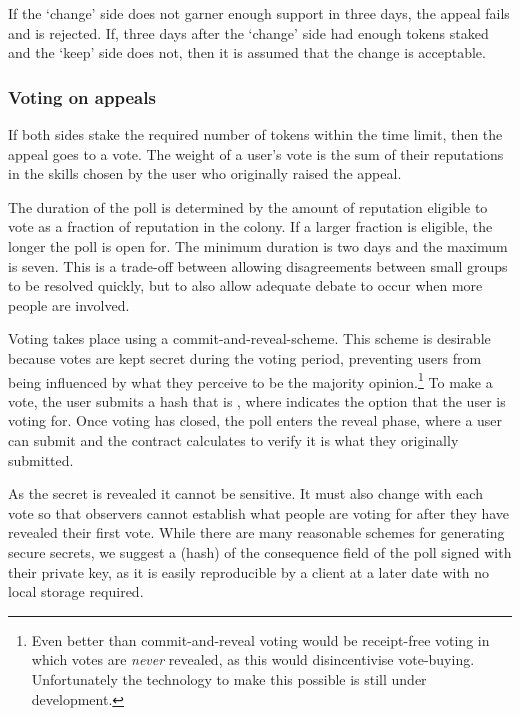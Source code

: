 If the `change' side does not garner enough support in three days, the appeal fails and is rejected. If, three days after the `change' side had enough tokens staked and the `keep' side does not, then it is assumed that the change is acceptable.

\subsubsection*{Voting on appeals}

If both sides stake the required number of tokens within the time limit, then the appeal goes to a vote. The weight of a user's vote is the sum of their reputations in the skills chosen by the user who originally raised the appeal.

The duration of the poll is determined by the amount of reputation eligible to vote as a fraction of reputation in the colony. If a larger fraction is eligible, the longer the poll is open for. The minimum duration is two days and the maximum is seven. This is a trade-off between allowing disagreements between small groups to be resolved quickly, but to also allow adequate debate to occur when more people are involved.

Voting takes place using a commit-and-reveal-scheme. This scheme is desirable because votes are kept secret during the voting period, preventing users from being influenced by what they perceive to be the majority opinion.\footnote{Even better than commit-and-reveal voting would be receipt-free voting in which votes are \textit{never} revealed, as this would disincentivise vote-buying. Unfortunately the technology to make this possible is still under development.} To make a vote, the user submits a hash that is , where  indicates the option that the user is voting for. Once voting has closed, the poll enters the reveal phase, where a user can submit  and the contract calculates  to verify it is what they originally submitted.

As the secret is revealed it cannot be sensitive. It must also change with each vote so that observers cannot establish what people are voting for after they have revealed their first vote. While there are many reasonable schemes for generating secure secrets, we suggest a (hash) of the consequence field of the poll signed with their private key, as it is easily reproducible by a client at a later date with no local storage required. \\

